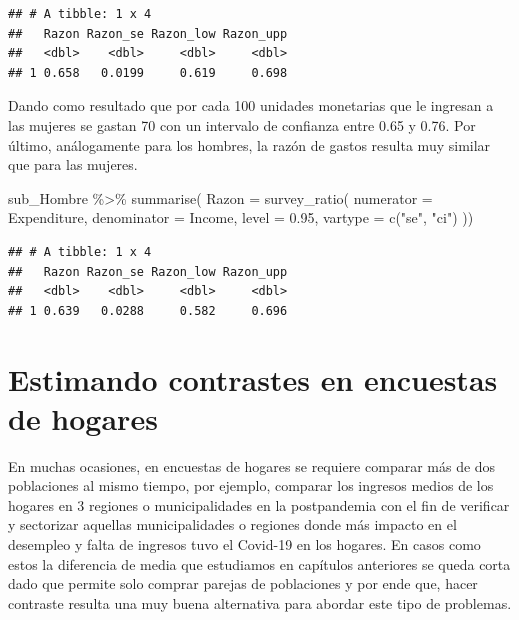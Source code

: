 \documentclass[
  12pt,
]{book}
\newenvironment{Shaded}{\begin{snugshade}}{\end{snugshade}}
\newcommand{\AttributeTok}[1]{\textcolor[rgb]{0.77,0.63,0.00}{#1}}
\newcommand{\FloatTok}[1]{\textcolor[rgb]{0.00,0.00,0.81}{#1}}
\newcommand{\FunctionTok}[1]{\textcolor[rgb]{0.00,0.00,0.00}{#1}}
\newcommand{\NormalTok}[1]{#1}
\newcommand{\SpecialCharTok}[1]{\textcolor[rgb]{0.00,0.00,0.00}{#1}}
\newcommand{\StringTok}[1]{\textcolor[rgb]{0.31,0.60,0.02}{#1}}
\begin{document}
\begin{verbatim}
## # A tibble: 1 x 4
##   Razon Razon_se Razon_low Razon_upp
##   <dbl>    <dbl>     <dbl>     <dbl>
## 1 0.658   0.0199     0.619     0.698
\end{verbatim}

Dando como resultado que por cada 100 unidades monetarias que le ingresan a las mujeres se gastan 70 con un intervalo de confianza entre 0.65 y 0.76. Por último, análogamente para los hombres, la razón de gastos resulta muy similar que para las mujeres.

\begin{Shaded}
\begin{Highlighting}[]
\NormalTok{sub\_Hombre }\SpecialCharTok{\%\textgreater{}\%} \FunctionTok{summarise}\NormalTok{(}
    \AttributeTok{Razon =}  \FunctionTok{survey\_ratio}\NormalTok{(}
      \AttributeTok{numerator =}\NormalTok{ Expenditure,}
      \AttributeTok{denominator =}\NormalTok{ Income,}
      \AttributeTok{level =} \FloatTok{0.95}\NormalTok{,}
    \AttributeTok{vartype =}  \FunctionTok{c}\NormalTok{(}\StringTok{"se"}\NormalTok{, }\StringTok{"ci"}\NormalTok{)}
\NormalTok{    ))}
\end{Highlighting}
\end{Shaded}

\begin{verbatim}
## # A tibble: 1 x 4
##   Razon Razon_se Razon_low Razon_upp
##   <dbl>    <dbl>     <dbl>     <dbl>
## 1 0.639   0.0288     0.582     0.696
\end{verbatim}

\hypertarget{estimando-contrastes-en-encuestas-de-hogares}{%
\section{Estimando contrastes en encuestas de hogares}\label{estimando-contrastes-en-encuestas-de-hogares}}

En muchas ocasiones, en encuestas de hogares se requiere comparar más de dos poblaciones al mismo tiempo, por ejemplo, comparar los ingresos medios de los hogares en 3 regiones o municipalidades en la postpandemia con el fin de verificar y sectorizar aquellas municipalidades o regiones donde más impacto en el desempleo y falta de ingresos tuvo el Covid-19 en los hogares. En casos como estos la diferencia de media que estudiamos en capítulos anteriores se queda corta dado que permite solo comprar parejas de poblaciones y por ende que, hacer contraste resulta una muy buena alternativa para abordar este tipo de problemas.
\end{document}

